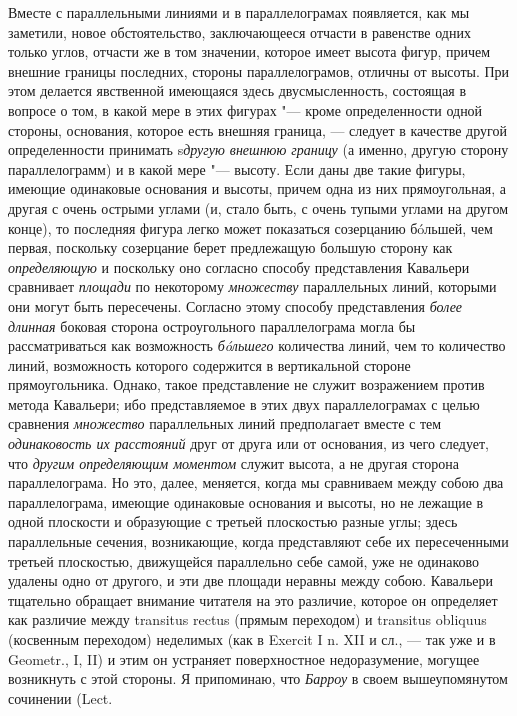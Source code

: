 {Вместе с параллельными линиями и в параллелограмах появляется, как мы
заметили, новое обстоятельство, заключающееся отчасти в равенстве одних
только углов, отчасти же в том значении, которое имеет высота фигур, причем
внешние границы последних, стороны параллелограмов, отличны от высоты. При
этом делается явственной имеющаяся здесь двусмысленность, состоящая в
вопросе о том, в какой мере в этих фигурах "--- кроме определенности одной
стороны, основания, которое есть внешняя граница, — следует в качестве
другой определенности принимать s{\em другую внешнюю
границу} (а именно, другую сторону параллелограмм) и в какой мере "--- высоту.
Если даны две такие фигуры, имеющие одинаковые основания и высоты, причем
одна из них прямоугольная, а другая с очень острыми углами (и, стало быть,
с очень тупыми углами на другом конце), то последняя фигура легко может
показаться созерцанию бóльшей, чем первая, поскольку созерцание берет
предлежащую большую сторону как {\em определяющую} и
поскольку оно согласно способу представления Кавальери сравнивает
{\em площади} по некоторому
{\em множеству} параллельных линий, которыми они могут
быть пересечены. Согласно этому способу представления
{\em более длинная} боковая сторона остроугольного
параллелограма могла бы рассматриваться как возможность
{\em бóльшего} количества линий, чем то количество
линий, возможность которого содержится в вертикальной стороне
прямоугольника. Однако, такое представление не служит возражением против
метода Кавальери; ибо представляемое в этих двух параллелограмах с целью
сравнения {\em множество} параллельных линий
предполагает вместе с тем {\em одинаковость их
расстояний} друг от друга или от основания, из чего следует, что
{\em другим определяющим моментом} служит высота, а не
другая сторона параллелограма. Но это, далее, меняется, когда мы сравниваем
между собою два параллелограма, имеющие одинаковые основания и высоты, но
не лежащие в одной плоскости и образующие с третьей плоскостью разные углы;
здесь параллельные сечения, возникающие, когда представляют себе их
пересеченными третьей плоскостью, движущейся параллельно себе самой, уже не
одинаково удалены одно от другого, и эти две площади неравны между собою.
Кавальери тщательно обращает внимание читателя на это различие, которое он
определяет как различие между transitus rectus (прямым переходом) и
transitus obliquus (косвенным переходом) неделимых (как в Exercit I n. XII
и сл., — так уже и в Geometr., I, II) и этим он устраняет поверхностное
недоразумение, могущее возникнуть с этой стороны. Я припоминаю, что
{\em Барроу} в своем вышеупомянутом сочинении (Lect.
}

